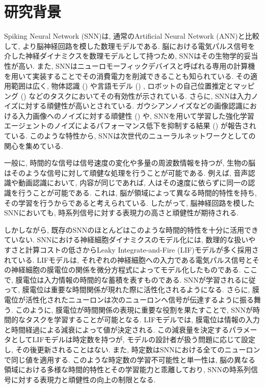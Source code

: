 \section{研究背景}
Spiking Neural Network (SNN)は, 通常のArtificial Neural Network (ANN)と比較して, より脳神経回路を模した数理モデルである.
脳における電気パルス信号を介した神経ダイナミクスを数理モデルとして持つため, SNNはその生物学的妥当性が高い\cite{taherkhani2020review}.
また, SNNはニューロモーフィックデバイスと呼ばれる専用の計算機を用いて実装することでその消費電力を削減できることも知られている\cite{balaji2019mapping}.
その適用範囲は広く, 物体認識 () や言語モデル () , ロボットの自己位置推定とマッピング () などのタスクにおいてその有効性が示されている\cite{yamazaki2022spiking, snnyolo, s23063037, spinnaker,snnslam}.
さらに, SNNは入力ノイズに対する頑健性が高いとされている.
ガウシアンノイズなどの画像認識における入力画像へのノイズに対する頑健性 () \cite{zhao2022spiking}や, SNNを用いて学習した強化学習エージェントのノイズによるパフォーマンス低下を抑制する結果 () が報告されている\cite{patel2019improved}.
このような特性から, SNNは次世代のニューラルネットワークとしての関心を集めている\cite{maass1997networks, wang2020supervised}.

一般に, 時間的な信号は信号速度の変化や多量の周波数情報を持つが, 生物の脳はそのような信号に対して頑健な処理を行うことが可能である.
例えば, 音声認識や動画認識において, 内容が同じであれば, 人はその速度に依らずに同一の認識を行うことが可能である.
これは, 脳が領域によって異なる時間的特性を持ち, その学習を行うからであると考えられている\cite{mattia2002population, deco2019brain}.
したがって, 脳神経回路を模したSNNにおいても, 時系列信号に対する表現力の高さと頑健性が期待される\cite{dhsnn}.

しかしながら, 既存のSNNのほとんどはこのような時間的特性を十分に活用できていない\cite{dhsnn}.
SNNにおける神経細胞ダイナミクスのモデル化には, 数理的な扱いやすさと計算コストの低さからLeaky Integrate-and-Fire (LIF)モデルが多く採用されている.
LIFモデルは, それぞれの神経細胞への入力である電気パルス信号とその神経細胞の膜電位の関係を微分方程式によってモデル化したものである.
ここで, 膜電位は入力情報の時間的な蓄積を表すものである.
SNNが学習されるに従って, 膜電位は重要な時間関係が現れた際に活性化されるようになる.
さらに, 膜電位が活性化されたニューロンは次のニューロンへ信号が伝達するように振る舞う.
このように, 膜電位が時間関係の表現に重要な役割を果たすことで, SNNが時間的なタスクを学習することが可能となる.
LIFモデルでは, 膜電位は情報の入力と時間経過による減衰によって値が決定される.
この減衰量を決定するパラメータとしてLIFモデルは時定数を持つが, モデルの設計者が扱う問題に応じて設定し, その後更新されることはない.
また, 時定数はSNNにおける全てのニューロンで同じ値を適用する.
このような時定数の学習不可能性と単一性は, 脳の異なる領域における多様な時間的特性とその学習能力と乖離しており, SNNの時系列信号に対する表現力と頑健性の向上の制限となる.


